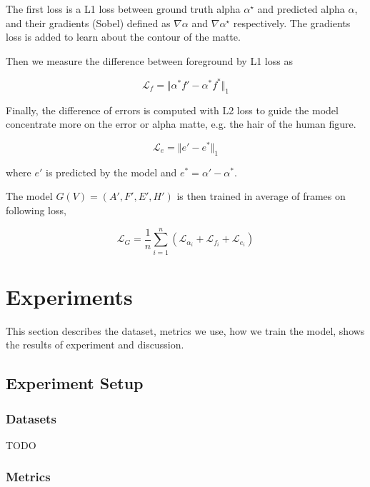 \documentclass[final]{cvpr}
\begin{document}
The first loss is a L1 loss between ground truth alpha $\alpha^\star$ and predicted alpha $\alpha$, and their gradients (Sobel) defined as $\nabla \alpha$ and $\nabla \alpha^\star$ respectively. The gradients loss is added to learn about the contour of the matte.

Then we measure the difference between foreground by L1 loss as

\begin{equation}
    \mathcal{L}_f=\Vert\alpha^*f'-\alpha^*f^*\Vert_1
\end{equation}\label{lossForeground}

Finally, the difference of errors is computed with L2 loss to guide the model concentrate more on the error or alpha matte, e.g. the hair of the human figure.

\begin{equation}
    \mathcal{L}_e=\Vert e'-e^*\Vert_1
\end{equation}\label{lossError}

where $e'$ is predicted by the model and $e^*=\alpha'-\alpha^*$.

The model $G(V)=(A',F',E',H')$ is then trained in average of frames on following loss,

\begin{equation}
    \mathcal{L}_G=\frac{1}{n}\sum_{i=1}^{n}\left(\mathcal{L}_{\alpha_i}+\mathcal{L}_{f_i}+\mathcal{L}_{e_i}\right)
\end{equation}\label{lossG}

\section{Experiments}

This section describes the dataset, metrics we use, how we train the model, shows the results of experiment and discussion.

\subsection{Experiment Setup}

\subsubsection{Datasets}

TODO

\subsubsection{Metrics}
\end{document}
